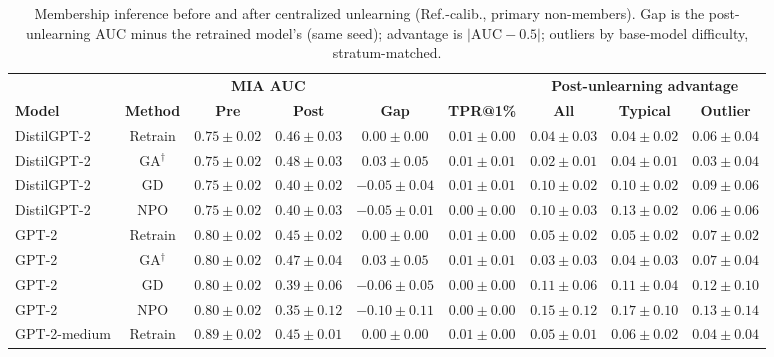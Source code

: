 \begin{table}[t]
\centering
\caption{Membership inference before and after centralized unlearning (Ref.-calib., primary non-members). Gap is the post-unlearning AUC minus the retrained model's (same seed); advantage is $|\mathrm{AUC}-0.5|$; outliers by base-model difficulty, stratum-matched.}
\label{tab:central-ref-calibrated-primary}
\footnotesize
\renewcommand{\arraystretch}{1.2}
\setlength{\tabcolsep}{3pt}
\begin{tabular*}{\textwidth}{@{\extracolsep{\fill}}lcccccccc@{}}
\toprule
 & & \multicolumn{2}{c}{\textbf{MIA AUC}} & & & \multicolumn{3}{c}{\textbf{Post-unlearning advantage}} \\
\cmidrule(lr){3-4}\cmidrule(lr){7-9}
\textbf{Model} & \textbf{Method} & \textbf{Pre} & \textbf{Post} & \textbf{Gap} & \textbf{TPR@1\%} & \textbf{All} & \textbf{Typical} & \textbf{Outlier} \\
\midrule
DistilGPT-2 & Retrain & $0.75 \pm 0.02$ & $0.46 \pm 0.03$ & $0.00 \pm 0.00$ & $0.01 \pm 0.00$ & $0.04 \pm 0.03$ & $0.04 \pm 0.02$ & $0.06 \pm 0.04$ \\
DistilGPT-2 & GA$^{\dagger}$ & $0.75 \pm 0.02$ & $0.48 \pm 0.03$ & $0.03 \pm 0.05$ & $0.01 \pm 0.01$ & $0.02 \pm 0.01$ & $0.04 \pm 0.01$ & $0.03 \pm 0.04$ \\
DistilGPT-2 & GD & $0.75 \pm 0.02$ & $0.40 \pm 0.02$ & $-0.05 \pm 0.04$ & $0.01 \pm 0.01$ & $0.10 \pm 0.02$ & $0.10 \pm 0.02$ & $0.09 \pm 0.06$ \\
DistilGPT-2 & NPO & $0.75 \pm 0.02$ & $0.40 \pm 0.03$ & $-0.05 \pm 0.01$ & $0.00 \pm 0.00$ & $0.10 \pm 0.03$ & $0.13 \pm 0.02$ & $0.06 \pm 0.06$ \\
GPT-2 & Retrain & $0.80 \pm 0.02$ & $0.45 \pm 0.02$ & $0.00 \pm 0.00$ & $0.01 \pm 0.00$ & $0.05 \pm 0.02$ & $0.05 \pm 0.02$ & $0.07 \pm 0.02$ \\
GPT-2 & GA$^{\dagger}$ & $0.80 \pm 0.02$ & $0.47 \pm 0.04$ & $0.03 \pm 0.05$ & $0.01 \pm 0.01$ & $0.03 \pm 0.03$ & $0.04 \pm 0.03$ & $0.07 \pm 0.04$ \\
GPT-2 & GD & $0.80 \pm 0.02$ & $0.39 \pm 0.06$ & $-0.06 \pm 0.05$ & $0.00 \pm 0.00$ & $0.11 \pm 0.06$ & $0.11 \pm 0.04$ & $0.12 \pm 0.10$ \\
GPT-2 & NPO & $0.80 \pm 0.02$ & $0.35 \pm 0.12$ & $-0.10 \pm 0.11$ & $0.00 \pm 0.00$ & $0.15 \pm 0.12$ & $0.17 \pm 0.10$ & $0.13 \pm 0.14$ \\
GPT-2-medium & Retrain & $0.89 \pm 0.02$ & $0.45 \pm 0.01$ & $0.00 \pm 0.00$ & $0.01 \pm 0.00$ & $0.05 \pm 0.01$ & $0.06 \pm 0.02$ & $0.04 \pm 0.04$ \\

\end{tabular*}
\end{table}
